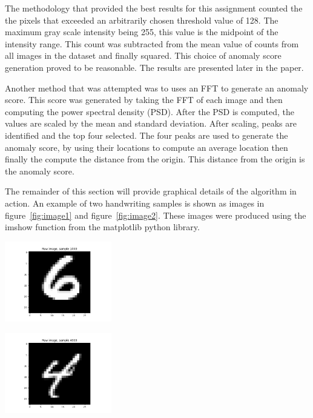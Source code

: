 The methodology that provided the best results for this assignment counted the the pixels that exceeded an arbitrarily chosen threshold value of 128. 
The maximum gray scale intensity being 255, this value is the midpoint of the intensity range. 
This count was subtracted from the mean value of counts from all images in the dataset and finally squared. 
This choice of anomaly score generation proved to be reasonable. The results are presented later in the paper. 

Another method that was attempted was to uses an FFT to generate an anomaly score. This score was generated by taking the FFT of each image and then computing the power spectral density (PSD). 
After the PSD is computed, the values are scaled by the mean and standard deviation. After scaling, peaks are identified and the top four selected.
The four peaks are used to generate the anomaly score, by using their locations to compute an average location then finally the compute the distance from the origin.
This distance from the origin is the anomaly score.  

The remainder of this section will provide graphical details of the algorithm in action.
\newline
\newline
\newline
\newline
An example of two handwriting samples is shown as images in figure~\ref{fig:image1} and figure~\ref{fig:image2}. These images were produced using the imshow function from the matplotlib python library.\newline

\begin{center}
\includegraphics[width=0.35\textwidth]{image1.png}
\end{center}

\begin{center}
\includegraphics[width=0.35\textwidth]{image2.png}
\end{center}

